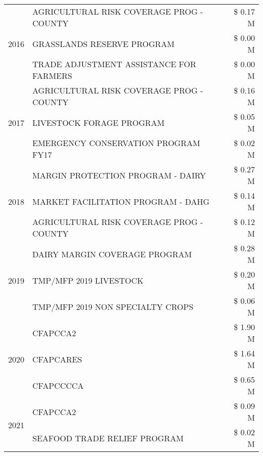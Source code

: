 \begin{tabular}{llr}
\cline{1-3}
\multirow[t]{3}{*}{2016} & AGRICULTURAL RISK COVERAGE PROG - COUNTY & \$ 0.17 M \\
 & GRASSLANDS RESERVE PROGRAM & \$ 0.00 M \\
 & TRADE ADJUSTMENT ASSISTANCE FOR FARMERS & \$ 0.00 M \\
\cline{1-3}
\multirow[t]{3}{*}{2017} & AGRICULTURAL RISK COVERAGE PROG - COUNTY & \$ 0.16 M \\
 & LIVESTOCK FORAGE PROGRAM & \$ 0.05 M \\
 & EMERGENCY CONSERVATION PROGRAM FY17 & \$ 0.02 M \\
\cline{1-3}
\multirow[t]{3}{*}{2018} & MARGIN PROTECTION PROGRAM - DAIRY & \$ 0.27 M \\
 & MARKET FACILITATION PROGRAM - DAHG & \$ 0.14 M \\
 & AGRICULTURAL RISK COVERAGE PROG - COUNTY & \$ 0.12 M \\
\cline{1-3}
\multirow[t]{3}{*}{2019} & DAIRY MARGIN COVERAGE PROGRAM & \$ 0.28 M \\
 & TMP/MFP 2019 LIVESTOCK & \$ 0.20 M \\
 & TMP/MFP 2019 NON SPECIALTY CROPS & \$ 0.06 M \\
\cline{1-3}
\multirow[t]{3}{*}{2020} & CFAPCCA2 & \$ 1.90 M \\
 & CFAPCARES & \$ 1.64 M \\
 & CFAPCCCCA & \$ 0.65 M \\
\cline{1-3}
\multirow[t]{2}{*}{2021} & CFAPCCA2 & \$ 0.09 M \\
 & SEAFOOD TRADE RELIEF PROGRAM & \$ 0.02 M \\
\cline{1-3}
\bottomrule
\end{tabular}

